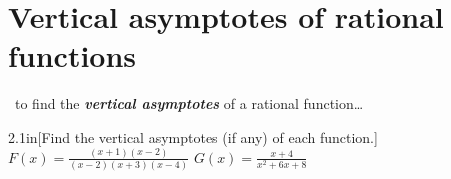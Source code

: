 \section{Vertical asymptotes of rational functions}

\begin{myConceptSteps}{~to find the {\bfseries\itshape vertical asymptotes} of a rational function\dots}
\end{myConceptSteps}


\begin{my2Problems}{2.1in}[Find the vertical asymptotes (if any) of each function.]
    {
        $F(x) = \frac{(x+1)(x-2)}{(x-2)(x+3)(x-4)}$
    }
    {
        $G(x) = \frac{x+4}{x^2 + 6x + 8}$
    }
\end{my2Problems}


